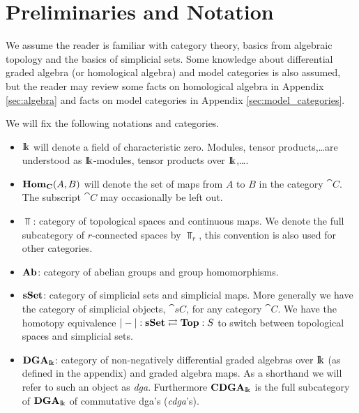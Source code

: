 \section{Preliminaries and Notation}

We assume the reader is familiar with category theory, basics from algebraic topology and the basics of simplicial sets. Some knowledge about differential graded algebra (or homological algebra) and model categories is also assumed, but the reader may review some facts on homological algebra in Appendix \ref{sec:algebra} and facts on model categories in Appendix \ref{sec:model_categories}.

We will fix the following notations and categories.
\begin{itemize}
	\item $\mathrm{I\!k}$ will denote a field of characteristic zero. Modules, tensor products,\dots are understood as $\mathrm{I\!k}$-modules, tensor products over $\mathrm{I\!k}$,\dots.
	\item $\mathbf{Hom}_{\mathbf{C}}(A, B)$ will denote the set of maps from $A$ to $B$ in the category $\cat{C}$. The subscript $\cat{C}$ may occasionally be left out.
	\item $\Top$: category of topological spaces and continuous maps. We denote the full subcategory of $r$-connected spaces by $\Top_r$, this convention is also used for other categories.
	\item $\mathbf{Ab}$: category of abelian groups and group homomorphisms.
	\item $\mathbf{s{\mathbf{Set}}}$: category of simplicial sets and simplicial maps. More generally we have the category of simplicial objects, $\cat{sC}$, for any category $\cat{C}$. We have the homotopy equivalence $|-| : \mathbf{s{\mathbf{Set}}} \rightleftarrows \mathbf{Top} : S$ to switch between topological spaces and simplicial sets.
	\item $\mathbf{DGA}_{\mathrm{I\!k}}$: category of non-negatively differential graded algebras over $\mathrm{I\!k}$ (as defined in the appendix) and graded algebra  maps. As a shorthand we will refer to such an object as \emph{dga}. Furthermore $\mathbf{CDGA}_{\mathrm{I\!k}}$ is the full subcategory of $\mathbf{DGA}_{\mathrm{I\!k}}$ of commutative dga's (\emph{cdga}'s).
\end{itemize}

\tableofcontents
{}
